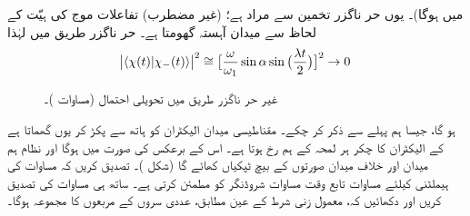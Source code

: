 میں  ہوگا)۔ یوں حر ناگزر تخمین سے مراد  ہے؛ (غیر مضطرب) تفاعلات موج کی ہیّت کے لحاظ سے میدان آہستہ گھومتا ہے۔ حر ناگزر طریق میں  لہٰذا 
\begin{align}
\abs{\langle \chi (t) | \chi_{-} (t) \rangle}^2 \cong \big [ \frac{\omega}{\omega_1} \sin \alpha \sin \big ( \frac{\lambda t}{2} \big ) \big ]^2 \to 0
\end{align}
%
\begin{figure}
\centering
{}
\caption{غیر حر ناگزر طریق  میں تحویلی احتمال (مساوات )۔}
\label{شکل_حرارت_نا_گزر_تحویلی_احتمال}
\end{figure}

ہو گا، جیسا ہم پہلے سے ذکر کر چکے۔ مقناطیسی میدان الیکٹران کو ہاتھ سے پکڑ کر یوں گھماتا ہے کے الیکٹران کا چکر ہر لمحہ  کے ہم رخ ہوتا ہے۔ اس کے
 برعکس  کی صورت میں  ہوگا اور نظام ہم میدان اور خلاف میدان صورتوں کے بیچ ٹپکیاں کھائے گا (شکل )۔
تصدیق کریں کہ مساوات  کی ہیملٹنی کیلئے مساوات  تابع وقت مساوات شروڈنگر کو مطمئن کرتی ہے۔ ساتھ ہی مساوات 
 کی تصدیق کریں اور دکھائیں کہ، معمول زنی شرط کے عین مطابق، عددی سروں کے مربعوں کا مجموعہ  ہوگا۔

